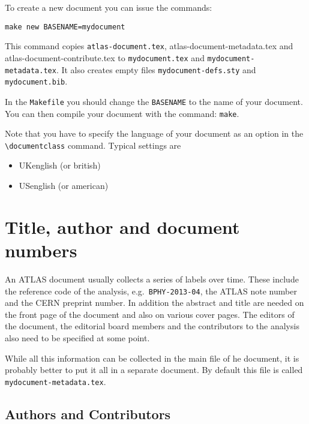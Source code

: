 \documentclass[koma,UKenglish]{style/atlasdoc}
\newcommand{\Macro}[1]{\texttt{\textbackslash #1}\xspace}
\begin{document}
To create a new document you can issue the commands:
%
\begin{verbatim}
make new BASENAME=mydocument
\end{verbatim}
%
This command copies \texttt{atlas-document.tex}, 
{atlas-document-metadata.tex} and {atlas-document-contribute.tex}
to \texttt{mydocument.tex} and  \texttt{mydocument-metadata.tex}.
It also creates empty files \texttt{mydocument-defs.sty} and \texttt{mydocument.bib}.

In the \texttt{Makefile} you should change the \texttt{BASENAME} to the name of your document.
You can then compile your document with the command: \texttt{make}.

Note that you have to specify the language of your document as an option in the
\Macro{documentclass} command. Typical settings are
\begin{itemize}
\item UKenglish (or british)
\item USenglish (or american)
\end{itemize}


\section{Title, author and document numbers}
\label{sec:metadata}

An ATLAS document usually collects a series of labels over time.
These include the reference code of the analysis, e.g.\ \texttt{BPHY-2013-04}, 
the ATLAS note number and the CERN preprint number.
In addition the abstract and title are needed on the front page of the document and also on various cover pages.
The editors of the document, the editorial board members and the contributors to the analysis
also need to be specified at some point.

While all this information can be collected in the main file of he document, 
it is probably better to put it all in a separate document.
By default this file is called \texttt{mydocument-metadata.tex}.


\subsection{Authors and Contributors}
\label{sec:contribute}
\end{document}
